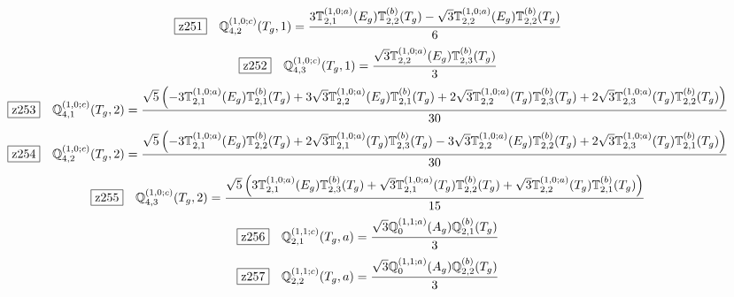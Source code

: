 \documentclass[fleqn,10pt,landscape]{jsarticle}
\begin{document}
\begin{dmath*}
\hspace*{3mm}\fbox{z251}\quad \mathbb{Q}_{4,2}^{(1,0;c)}(T_{g},1)=\frac{3 \mathbb{T}_{2,1}^{(1,0;a)}(E_{g}) \mathbb{T}_{2,2}^{(b)}(T_{g}) - \sqrt{3} \mathbb{T}_{2,2}^{(1,0;a)}(E_{g}) \mathbb{T}_{2,2}^{(b)}(T_{g})}{6}
\end{dmath*}
\begin{dmath*}
\hspace*{3mm}\fbox{z252}\quad \mathbb{Q}_{4,3}^{(1,0;c)}(T_{g},1)=\frac{\sqrt{3} \mathbb{T}_{2,2}^{(1,0;a)}(E_{g}) \mathbb{T}_{2,3}^{(b)}(T_{g})}{3}
\end{dmath*}
\begin{dmath*}
\hspace*{3mm}\fbox{z253}\quad \mathbb{Q}_{4,1}^{(1,0;c)}(T_{g},2)=\frac{\sqrt{5} \left(- 3 \mathbb{T}_{2,1}^{(1,0;a)}(E_{g}) \mathbb{T}_{2,1}^{(b)}(T_{g}) + 3 \sqrt{3} \mathbb{T}_{2,2}^{(1,0;a)}(E_{g}) \mathbb{T}_{2,1}^{(b)}(T_{g}) + 2 \sqrt{3} \mathbb{T}_{2,2}^{(1,0;a)}(T_{g}) \mathbb{T}_{2,3}^{(b)}(T_{g}) + 2 \sqrt{3} \mathbb{T}_{2,3}^{(1,0;a)}(T_{g}) \mathbb{T}_{2,2}^{(b)}(T_{g})\right)}{30}
\end{dmath*}
\begin{dmath*}
\hspace*{3mm}\fbox{z254}\quad \mathbb{Q}_{4,2}^{(1,0;c)}(T_{g},2)=\frac{\sqrt{5} \left(- 3 \mathbb{T}_{2,1}^{(1,0;a)}(E_{g}) \mathbb{T}_{2,2}^{(b)}(T_{g}) + 2 \sqrt{3} \mathbb{T}_{2,1}^{(1,0;a)}(T_{g}) \mathbb{T}_{2,3}^{(b)}(T_{g}) - 3 \sqrt{3} \mathbb{T}_{2,2}^{(1,0;a)}(E_{g}) \mathbb{T}_{2,2}^{(b)}(T_{g}) + 2 \sqrt{3} \mathbb{T}_{2,3}^{(1,0;a)}(T_{g}) \mathbb{T}_{2,1}^{(b)}(T_{g})\right)}{30}
\end{dmath*}
\begin{dmath*}
\hspace*{3mm}\fbox{z255}\quad \mathbb{Q}_{4,3}^{(1,0;c)}(T_{g},2)=\frac{\sqrt{5} \left(3 \mathbb{T}_{2,1}^{(1,0;a)}(E_{g}) \mathbb{T}_{2,3}^{(b)}(T_{g}) + \sqrt{3} \mathbb{T}_{2,1}^{(1,0;a)}(T_{g}) \mathbb{T}_{2,2}^{(b)}(T_{g}) + \sqrt{3} \mathbb{T}_{2,2}^{(1,0;a)}(T_{g}) \mathbb{T}_{2,1}^{(b)}(T_{g})\right)}{15}
\end{dmath*}
\begin{dmath*}
\hspace*{3mm}\fbox{z256}\quad \mathbb{Q}_{2,1}^{(1,1;c)}(T_{g},a)=\frac{\sqrt{3} \mathbb{Q}_{0}^{(1,1;a)}(A_{g}) \mathbb{Q}_{2,1}^{(b)}(T_{g})}{3}
\end{dmath*}
\begin{dmath*}
\hspace*{3mm}\fbox{z257}\quad \mathbb{Q}_{2,2}^{(1,1;c)}(T_{g},a)=\frac{\sqrt{3} \mathbb{Q}_{0}^{(1,1;a)}(A_{g}) \mathbb{Q}_{2,2}^{(b)}(T_{g})}{3}
\end{dmath*}
\end{document}
